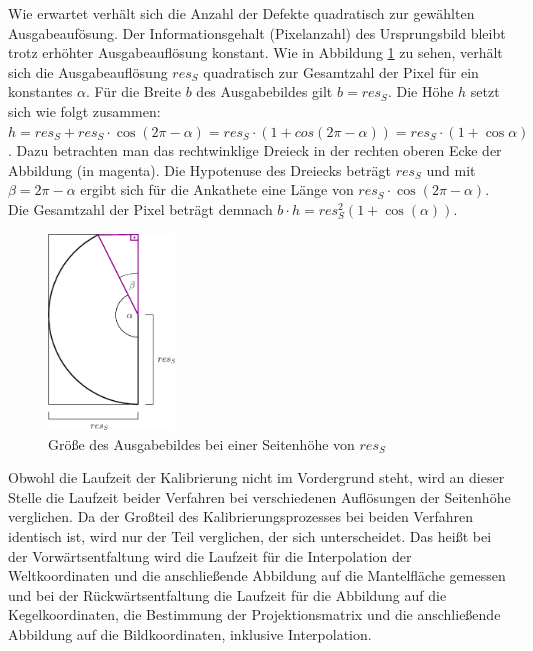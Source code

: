 Wie erwartet verhält sich die Anzahl der Defekte quadratisch zur gewählten Ausgabeaufösung. Der Informationsgehalt (Pixelanzahl) des Ursprungsbild bleibt trotz erhöhter Ausgabeauflösung konstant. Wie in Abbildung \ref{fig:sizeOutput} zu sehen, verhält sich die Ausgabeauflösung $res_S$ quadratisch zur Gesamtzahl der Pixel für ein konstantes $\alpha$. Für die Breite $b$ des Ausgabebildes gilt $b = res_S$.
Die Höhe $h$ setzt sich wie folgt zusammen: $h = res_S + res_S\cdot\cos(2\pi-\alpha) = res_S\cdot(1 + cos(2\pi-\alpha)) = res_S\cdot(1+\cos\alpha)$. Dazu betrachten man das rechtwinklige Dreieck in der rechten oberen Ecke der Abbildung (in magenta). Die Hypotenuse des Dreiecks beträgt $res_S$ und mit $\beta = 2\pi - \alpha$ ergibt sich für die Ankathete eine Länge von $res_S\cdot\cos(2\pi-\alpha)$. Die Gesamtzahl der Pixel beträgt demnach $b\cdot h = res_S^2(1+\cos(\alpha))$.

\begin{figure}[!htb]
	\centering
	\includegraphics[width=0.3\textwidth]{images/sizeOutput.eps}
	\caption{Größe des Ausgabebildes bei einer Seitenhöhe von $res_S$}
	\label{fig:sizeOutput}
\end{figure}


Obwohl die Laufzeit der Kalibrierung nicht im Vordergrund steht, wird an dieser Stelle die Laufzeit beider Verfahren bei verschiedenen Auflösungen der Seitenhöhe verglichen. Da der Großteil des Kalibrierungsprozesses bei beiden Verfahren identisch ist, wird nur der Teil verglichen, der sich unterscheidet. Das heißt bei der Vorwärtsentfaltung wird die Laufzeit für die Interpolation der Weltkoordinaten und die anschließende Abbildung auf die Mantelfläche gemessen und bei der Rückwärtsentfaltung die Laufzeit für die Abbildung auf die Kegelkoordinaten, die Bestimmung der Projektionsmatrix und die anschließende Abbildung auf die Bildkoordinaten, inklusive Interpolation.


